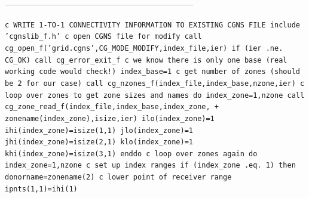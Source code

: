 \documentclass[12pt]{article}
\begin{document}
--------------------------------------------------------------------

{\tt \noindent c  WRITE 1-TO-1 CONNECTIVITY INFORMATION TO EXISTING CGNS FILE
\newline\indent      include 'cgnslib\_f.h'
\newline c  open CGNS file for modify
\newline\indent      call cg\_open\_f('grid.cgns',CG\_MODE\_MODIFY,index\_file,ier)
\newline\indent      if (ier .ne. CG\_OK) call cg\_error\_exit\_f
\newline c  we know there is only one base (real working code would check!)
\newline\indent      index\_base=1
\newline c   get number of zones (should be 2 for our case)
\newline\indent      call cg\_nzones\_f(index\_file,index\_base,nzone,ier)
\newline c   loop over zones to get zone sizes and names
\newline\indent      do index\_zone=1,nzone
\newline\indent\indent      call cg\_zone\_read\_f(index\_file,index\_base,index\_zone,
\newline \indent + \indent zonename(index\_zone),isize,ier)
\newline\indent\indent      ilo(index\_zone)=1
\newline\indent\indent      ihi(index\_zone)=isize(1,1)
\newline\indent\indent      jlo(index\_zone)=1
\newline\indent\indent      jhi(index\_zone)=isize(2,1)
\newline\indent\indent      klo(index\_zone)=1
\newline\indent\indent      khi(index\_zone)=isize(3,1)
\newline\indent      enddo
\newline c   loop over zones again
\newline\indent      do index\_zone=1,nzone
\newline c   set up index ranges
\newline\indent\indent   if (index\_zone .eq. 1) then
\newline\indent\indent\indent      donorname=zonename(2)
\newline c   lower point of receiver range
\newline\indent\indent\indent      ipnts(1,1)=ihi(1)
}
\end{document}
